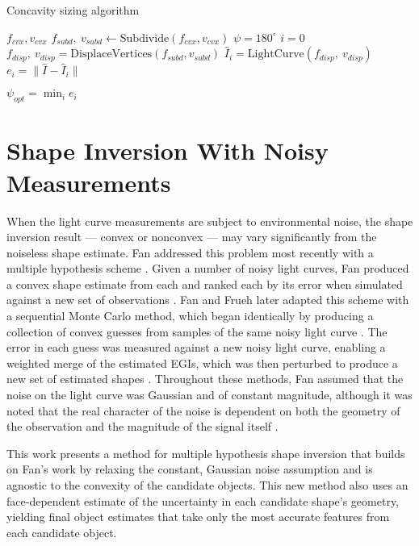 \begin{algorithm}
  \caption{Concavity sizing algorithm}\label{alg:concavity_iter}
  \begin{algorithmic}
    \State $f_{cvx},v_{cvx}$ 
    \State $f_{subd}, \:v_{subd} \gets \mathrm{Subdivide}(f_{cvx},v_{cvx})$ 
    \State $\psi = 180^\circ$ 
    \State $i = 0$ 
      \State $f_{disp}, \:v_{disp} = \mathrm{DisplaceVertices}(f_{subd},v_{subd})$
      \State $\hat{I}_{i} = \mathrm{LightCurve}(f_{disp}, \:v_{disp})$
      \State $e_i = \| \hat{I} - \hat{I}_{i} \|$
      \State{$\psi \gets \psi + \Delta \psi$}
    \EndWhile

    $\psi_{opt} = \min_i{e_i}$
  \end{algorithmic}
\end{algorithm}

\section{Shape Inversion With Noisy Measurements}

When the light curve measurements are subject to environmental noise, the shape inversion result --- convex or nonconvex --- may vary significantly from the noiseless shape estimate. Fan addressed this problem most recently with a multiple hypothesis scheme \cite{fan2020thesis}. Given a number of noisy light curves, Fan produced a convex shape estimate from each and ranked each by its error when simulated against a new set of observations \cite{fan2020thesis}. Fan and Frueh later adapted this scheme with a sequential Monte Carlo method, which began identically by producing a collection of convex guesses from samples of the same noisy light curve \cite{fan20201}. The error in each guess was measured against a new noisy light curve, enabling a weighted merge of the estimated EGIs, which was then perturbed to produce a new set of estimated shapes \cite{fan2021}. Throughout these methods, Fan assumed that the noise on the light curve was Gaussian and of constant magnitude, although it was noted that the real character of the noise is dependent on both the geometry of the observation and the magnitude of the signal itself \cite{fan2020thesis}. 

This work presents a method for multiple hypothesis shape inversion that builds on Fan's work by relaxing the constant, Gaussian noise assumption and is agnostic to the convexity of the candidate objects. This new method also uses an face-dependent estimate of the uncertainty in each candidate shape's geometry, yielding final object estimates that take only the most accurate features from each candidate object.

